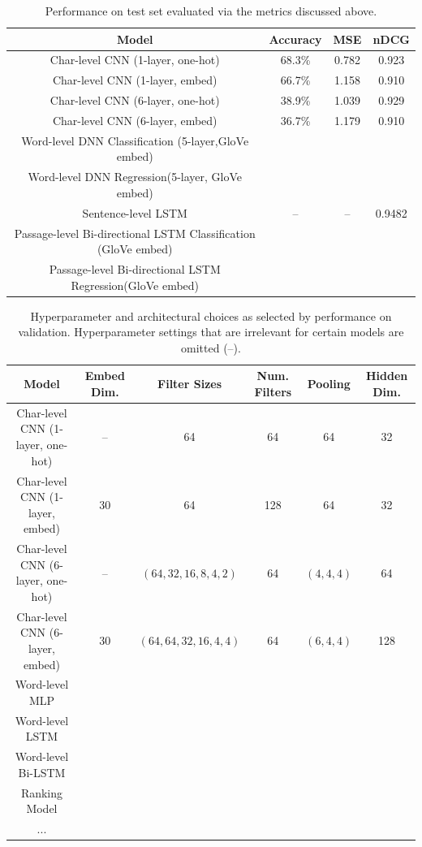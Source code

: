 \documentclass[10pt,psamsfonts]{amsart}
\theoremstyle{definition}
\theoremstyle{remark}
\numberwithin{equation}{section}
\begin{document}
\begin{table}
	\begin{tabular}{c|c|c|c}
		Model & Accuracy & MSE & nDCG  \\\hline
		Char-level CNN (1-layer, one-hot) & 68.3\% & 0.782 & 0.923 \\
		Char-level CNN (1-layer, embed) & 66.7\% & 1.158& 0.910\\
		Char-level CNN (6-layer, one-hot) & 38.9\% & 1.039 & 0.929 \\
		Char-level CNN (6-layer, embed) & 36.7\%& 1.179 & 0.910 \\
		Word-level DNN Classification (5-layer,GloVe embed) & & &  \\
		Word-level DNN Regression(5-layer, GloVe embed) & & &  \\
		Sentence-level LSTM & -- & -- & 0.9482 \\
		Passage-level Bi-directional LSTM Classification (GloVe embed) & & &  \\
		Passage-level Bi-directional LSTM Regression(GloVe embed) & & & 
		
	\end{tabular}
	\caption{Performance on test set evaluated via the metrics discussed above.}
	\label{fig:eval}
\end{table}


\begin{table}
	\begin{tabular}{c|c|c|c|c|c}
		Model & Embed Dim. & Filter Sizes & Num. Filters & Pooling & Hidden Dim. \\\hline
		Char-level CNN (1-layer, one-hot) & -- & 64 & 64 & 64 & 32 \\
		Char-level CNN (1-layer, embed) &  30 & 64 & 128 & 64 & 32 \\
		Char-level CNN (6-layer, one-hot) & -- & $(64, 32, 16, 8, 4, 2)$ & 64 & $(4,4,4)$ & 64 \\
		Char-level CNN (6-layer, embed) & 30 & $(64, 64, 32, 16, 4, 4)$ & 64 & $(6,4,4)$ & 128 \\
		Word-level MLP  & & & & & \\
		Word-level LSTM  & & & & & \\
		Word-level Bi-LSTM  & & & & & \\
		Ranking Model & & & & & \\
		...  & & & & &
	\end{tabular}
	\caption{Hyperparameter and architectural choices as selected by performance on validation. Hyperparameter settings that are irrelevant for certain models are omitted (--).}
	\label{fig:params}
\end{table}
\end{document}
